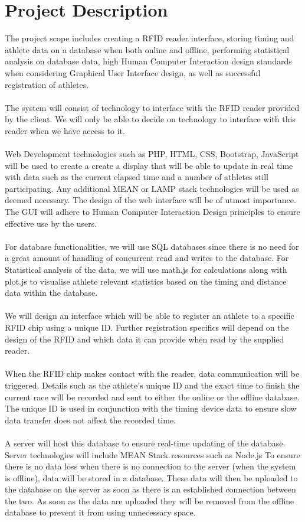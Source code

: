 \documentclass[12pt,a4paper]{article}
\begin{document}
   \section{Project Description}
The project scope includes creating a RFID reader interface, storing timing and athlete data on a database when both online and offline, performing statistical analysis on database data, high Human Computer Interaction design standards when considering Graphical User Interface design, as well as successful registration of athletes.\\\\
The system will consist of technology to interface with the RFID reader provided by the client. We will only be able to decide on technology to interface with this reader when we have access to it. \\\\
Web Development technologies such as PHP, HTML, CSS, Bootstrap, JavaScript will be used to create a create a display that will be able to update in real time with data such as the current elapsed time and a number of athletes still participating. Any additional MEAN or LAMP stack technologies will be used as deemed necessary. The design of the web interface will be of utmost importance. The GUI will adhere to Human Computer Interaction Design principles to ensure effective use by the users.\\\\
For database functionalities, we will use SQL databases since there is no need for a great amount of handling of concurrent read and writes to the database. For Statistical analysis of the data, we will use math.js for calculations along with plot.js to visualise athlete relevant statistics based on the timing and distance data within the database. \\\\
We will design an interface which will be able to register an athlete to a specific RFID chip using a unique ID. Further registration specifics will depend on the design of the RFID and which data it can provide when read by the supplied reader.\\\\
When the RFID chip makes contact with the reader, data communication will be triggered. Details such as the athlete's unique ID and the exact time to finish the current race will be recorded and sent to either the online or the offline database. The unique ID is used in conjunction with the timing device data to ensure slow data transfer does not affect the recorded time.\\\\
A server will host this database to ensure real-time updating of the database. Server technologies will include MEAN Stack resources such as Node.js To ensure there is no data loss when there is no connection to the server (when the system is offline), data will be stored in a database. These data will then be uploaded to the database on the server as soon as there is an established connection between the two. As soon as the data are uploaded they will be removed from the offline database to prevent it from using unnecessary space. 
\end{document}

